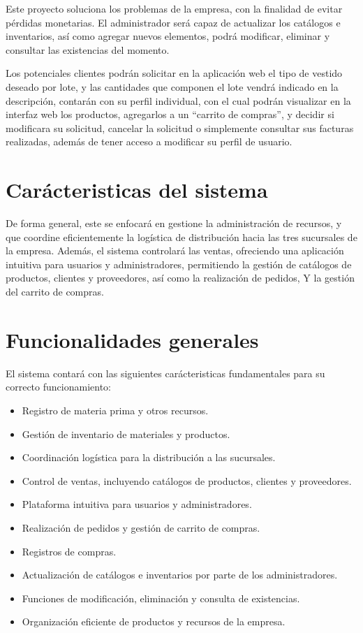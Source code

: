\documentclass[conference]{IEEEtran}
\begin{document}
Este proyecto soluciona los problemas de la empresa, con la finalidad de evitar pérdidas
monetarias. El administrador será capaz de actualizar los catálogos e inventarios, así como
agregar nuevos elementos, podrá modificar, eliminar y consultar las existencias del
momento. \linebreak  

Los potenciales clientes podrán solicitar en la aplicación web el tipo de vestido
deseado por lote, y las cantidades que componen el lote vendrá indicado en la
descripción, contarán con su perfil individual, con el cual podrán visualizar en la
interfaz web los productos, agregarlos a un “carrito de compras”, y decidir si
modificara su solicitud, cancelar la solicitud o simplemente consultar sus facturas
realizadas, además de tener acceso a modificar su perfil de usuario.
		
\section{Carácteristicas del sistema}

De forma general, este se enfocará en gestione la administración de recursos, y que coordine eficientemente la logística de distribución hacia las tres sucursales de la empresa. Además, el sistema controlará las ventas, ofreciendo una aplicación intuitiva para usuarios y administradores, permitiendo la gestión de catálogos de productos, clientes y proveedores, así como la realización de pedidos, Y la gestión del carrito de compras.

\section{Funcionalidades generales}

El sistema contará con las siguientes carácteristicas fundamentales para su correcto funcionamiento:

\begin{itemize}
	\item Registro de materia prima y otros recursos.
	\item Gestión de inventario de materiales y productos.
	\item Coordinación logística para la distribución a las sucursales.
	\item Control de ventas, incluyendo catálogos de productos, clientes y proveedores.
	\item Plataforma intuitiva para usuarios y administradores.
	\item Realización de pedidos y gestión de carrito de compras.
	\item Registros de compras.
	\item Actualización de catálogos e inventarios por parte de los administradores.
	\item Funciones de modificación, eliminación y consulta de existencias.
	\item Organización eficiente de productos y recursos de la empresa.
\end{itemize}
\end{document}
